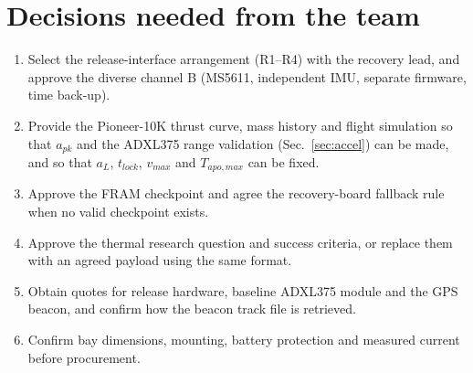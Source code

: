 \section{Decisions needed from the team}
\begin{enumerate}
\item Select the release-interface arrangement (R1--R4) with the recovery lead, and approve the diverse channel B (MS5611, independent IMU, separate firmware, time back-up).
\item Provide the Pioneer-10K thrust curve, mass history and flight simulation so that $a_{pk}$ and the ADXL375 range validation (Sec.~\ref{sec:accel}) can be made, and so that $a_L$, $t_{lock}$, $v_{max}$ and $T_{apo,max}$ can be fixed.
\item Approve the FRAM checkpoint and agree the recovery-board fallback rule when no valid checkpoint exists.
\item Approve the thermal research question and success criteria, or replace them with an agreed payload using the same format.
\item Obtain quotes for release hardware, baseline ADXL375 module and the GPS beacon, and confirm how the beacon track file is retrieved.
\item Confirm bay dimensions, mounting, battery protection and measured current before procurement.
\end{enumerate}

\printbibliography[title={References}]
